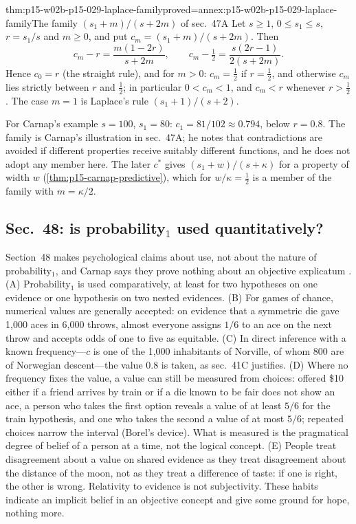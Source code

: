 \begin{hbtheorem}{thm:p15-w02b-p15-029-laplace-family}{proved=annex:p15-w02b-p15-029-laplace-family}{The family \((s_1+m)/(s+2m)\) of sec.~47A}
Let \(s\geq1\), \(0\leq s_1\leq s\), \(r=s_1/s\) and \(m\geq0\), and
put \(c_m=(s_1+m)/(s+2m)\). Then
\[
 c_m-r=\frac{m(1-2r)}{s+2m},\qquad
 c_m-\tfrac12=\frac{s(2r-1)}{2(s+2m)}.
\]
Hence \(c_0=r\) (the straight rule), and for \(m>0\): \(c_m=\tfrac12\)
if \(r=\tfrac12\), and otherwise \(c_m\) lies strictly between \(r\)
and \(\tfrac12\); in particular \(0<c_m<1\), and \(c_m<r\) whenever
\(r>\tfrac12\). The case \(m=1\) is Laplace's rule
\((s_1+1)/(s+2)\).
\end{hbtheorem}

For Carnap's example \(s=100\), \(s_1=80\): \(c_1=81/102\approx0.794\),
below \(r=0.8\). The family is Carnap's illustration in sec.~47A; he
notes that contradictions are avoided if different properties receive
suitably different functions, and he does not adopt any member here.
The later \(c^*\) gives \((s_1+w)/(s+\kappa)\) for a property of width
\(w\) (\cref{thm:p15-carnap-predictive}), which for \(w/\kappa=\tfrac12\)
is a member of the family with \(m=\kappa/2\).

\subsection*{Sec.~48: is probability\texorpdfstring{\(_1\)}{1} used quantitatively?}

Section~48 makes psychological claims about use, not about the nature of
probability\(_1\), and Carnap says they prove nothing about an
objective explicatum \cite[sec.~48, pp.~233--241]{Carnap1950Probability}.
(A) Probability\(_1\) is used comparatively, at least for two hypotheses
on one evidence or one hypothesis on two nested evidences. (B) For games
of chance, numerical values are generally accepted: on evidence that a
symmetric die gave 1{,}000 aces in 6{,}000 throws, almost everyone
assigns \(1/6\) to an ace on the next throw and accepts odds of one to
five as equitable. (C) In direct inference with a known frequency---\(c\)
is one of the 1{,}000 inhabitants of Norville, of whom 800 are of
Norwegian descent---the value \(0.8\) is taken, as sec.~41C justifies.
(D) Where no frequency fixes the value, a value can still be measured
from choices: offered \$10 either if a friend arrives by train or if a
die known to be fair does not show an ace, a person who takes the first
option reveals a value of at least \(5/6\) for the train hypothesis, and
one who takes the second a value of at most \(5/6\); repeated choices
narrow the interval (Borel's device). What is measured is the
pragmatical degree of belief of a person at a time, not the logical
concept. (E) People treat disagreement about a value on shared evidence
as they treat disagreement about the distance of the moon, not as they
treat a difference of taste: if one is right, the other is wrong.
Relativity to evidence is not subjectivity. These habits indicate an
implicit belief in an objective concept and give some ground for hope,
nothing more.

